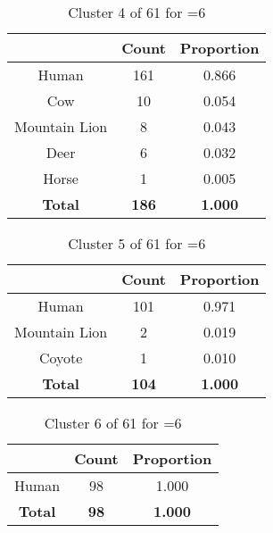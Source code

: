 \begin{table}[ht!]
\centering
\begin{tabular}{|c|c|c|}
\hline
\bf \Spec{} &\bf Count &\bf Proportion\\ \hline \hline
Human & 161 & 0.866\\ \hline
Cow & 10 & 0.054\\ \hline
Mountain Lion & 8 & 0.043\\ \hline
Deer & 6 & 0.032\\ \hline
Horse & 1 & 0.005\\ \hline
\hline
\bf Total & \bf 186 & \bf 1.000\\ \hline
\end{tabular}
\label{tab:cluster:4:6}
\caption{Cluster 4 of 61 for \minneigh{}=6}
\end{table}

\begin{table}[ht!]
\centering
\begin{tabular}{|c|c|c|}
\hline
\bf \Spec{} &\bf Count &\bf Proportion\\ \hline \hline
Human & 101 & 0.971\\ \hline
Mountain Lion & 2 & 0.019\\ \hline
Coyote & 1 & 0.010\\ \hline
\hline
\bf Total & \bf 104 & \bf 1.000\\ \hline
\end{tabular}
\label{tab:cluster:5:6}
\caption{Cluster 5 of 61 for \minneigh{}=6}
\end{table}

\begin{table}[ht!]
\centering
\begin{tabular}{|c|c|c|}
\hline
\bf \Spec{} &\bf Count &\bf Proportion\\ \hline \hline
Human & 98 & 1.000\\ \hline
\hline
\bf Total & \bf 98 & \bf 1.000\\ \hline
\end{tabular}
\label{tab:cluster:6:6}
\caption{Cluster 6 of 61 for \minneigh{}=6}
\end{table}

